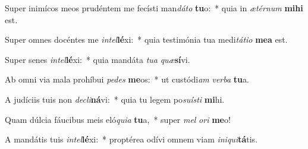 \item Super inimícos meos prudéntem me fecísti man\textit{dá}\textit{to} \textbf{tu}o:~* quia in \textit{æ}\textit{tér}\textit{num} \textbf{mi}\textbf{hi} est.
\item Super omnes docéntes me \textit{in}\textit{tel}\textbf{lé}xi:~* quia testimónia tua medi\textit{tá}\textit{ti}\textit{o} \textbf{me}\textbf{a} est.
\item Super senes \textit{in}\textit{tel}\textbf{lé}xi:~* quia mandáta \textit{tu}\textit{a} \textit{quæ}\textbf{sí}vi.
\item Ab omni via mala prohíbui \textit{pe}\textit{des} \textbf{me}os:~* ut custódi\textit{am} \textit{ver}\textit{ba} \textbf{tu}a.
\item A judíciis tuis non \textit{de}\textit{cli}\textbf{ná}vi:~* quia tu legem po\textit{su}\textit{ís}\textit{ti} \textbf{mi}hi.
\item Quam dúlcia fáucibus meis eló\textit{qui}\textit{a} \textbf{tu}a,~* super \textit{mel} \textit{o}\textit{ri} \textbf{me}o!
\item A mandátis tuis \textit{in}\textit{tel}\textbf{lé}xi:~* proptérea odívi omnem viam \textit{in}\textit{i}\textit{qui}\textbf{tá}tis.
